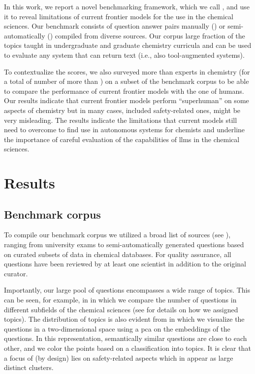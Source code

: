 \documentclass[11pt, oneside]{article}
\begin{document}
In this work, we report a novel benchmarking framework, which we call \chembench, and use it to reveal limitations of current frontier models for the use in the chemical sciences.
Our benchmark consists of  question answer pairs manually (\unskip) or semi-automatically (\unskip) compiled from diverse sources.
Our corpus large fraction of the topics taught in undergraduate and graduate chemistry curricula and can be used to evaluate any system that can return text (i.e., also tool-augmented systems).

To contextualize the scores, we also surveyed more than  experts in chemistry (for a total of number of more than \unskip) on a subset of the benchmark corpus to be able to compare the performance of current frontier models with the one of humans.
Our results indicate that current frontier models perform \enquote{superhuman} on some aspects of chemistry but in many cases, included safety-related ones, might be very misleading.
The results indicate the limitations that current models still need to overcome to find use in autonomous systems for chemists and underline the importance of careful evaluation of the capabilities of \glspl{llm} in the chemical sciences.

\section{Results}

\subsection{Benchmark corpus}

To compile our benchmark corpus we utilized a broad list of sources (see ), ranging from university exams to semi-automatically generated questions based on curated subsets of data in chemical databases.
For quality assurance, all questions have been reviewed by at least one scientist in addition to the original curator. 

Importantly, our large pool of questions encompasses a wide range of topics.
This can be seen, for example, in  in which we compare the number of questions in different subfields of the chemical sciences (see  for details on how we assigned topics).
The distribution of topics is also evident from  in which we visualize the questions in a two-dimensional space using a \gls{pca} on the embeddings of the questions.
In this representation, semantically similar questions are close to each other, and we color the points based on a classification into  topics. 
It is clear that a focus of \chembench (by design) lies on safety-related aspects which in  appear as large distinct clusters.
\end{document}
